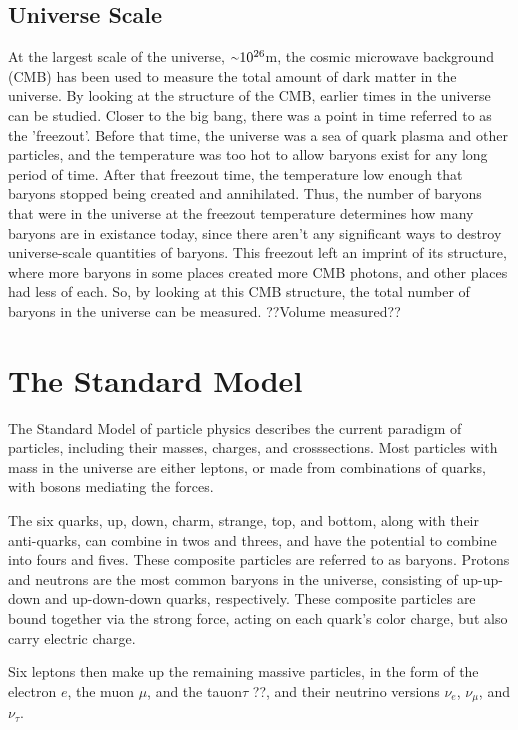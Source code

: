 \subsection{Universe Scale}
%
At the largest scale of the universe, $\nicetilde 10^{26}$m, the cosmic microwave background (CMB) has been used to measure the total amount of dark matter in the universe.
By looking at the structure of the CMB, earlier times in the universe can be studied.
Closer to the big bang, there was a point in time referred to as the 'freezout'.
Before that time, the universe was a sea of quark plasma and other particles, and the temperature was too hot to allow baryons exist for any long period of time.
After that freezout time, the temperature low enough that baryons stopped being created and annihilated.
Thus, the number of baryons that were in the universe at the freezout temperature determines how many baryons are in existance today, since there aren't any significant ways to destroy universe-scale quantities of baryons.
This freezout left an imprint of its structure, where more baryons in some places created more CMB photons, and other places had less of each.
So, by looking at this CMB structure, the total number of baryons in the universe can be measured.
??Volume measured??


\section{The Standard Model}

The Standard Model of particle physics describes the current paradigm of particles, including their masses, charges, and crosssections.
Most particles with mass in the universe are either leptons, or made from combinations of quarks, with bosons mediating the forces.

The six quarks, up, down, charm, strange, top, and bottom, along with their anti-quarks, can combine in twos and threes, and have the potential to combine into fours and fives.
These composite particles are referred to as baryons.
Protons and neutrons are the most common baryons in the universe, consisting of up-up-down and up-down-down quarks, respectively.
These composite particles are bound together via the strong force, acting on each quark's color charge, but also carry electric charge.

Six leptons then make up the remaining massive particles, in the form of the electron $e$, the muon $\mu$, and the tauon$\tau$ ??, and their neutrino versions $\nu_e$, $\nu_\mu$, and $\nu_\tau$.

